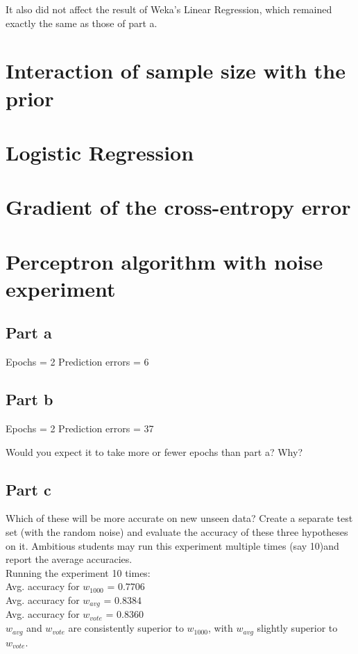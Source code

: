 \documentclass{article}
\begin{document}
It also did not affect the result of Weka's Linear Regression, which remained exactly the same as those of part a. 

\section{Interaction of sample size with the prior}

\section{Logistic Regression}

\section{Gradient of the cross-entropy error}

\section{Perceptron algorithm with noise experiment}

\subsection*{Part a}
Epochs = 2
Prediction errors = 6

\subsection*{Part b}

Epochs = 2
Prediction errors = 37

Would you expect it to take more or fewer epochs than part a? Why?

\subsection*{Part c}

Which of these will be more accurate on new unseen data? Create a separate test set (with the random noise) and evaluate the accuracy of these three hypotheses on it. Ambitious students may run this experiment multiple times (say 10)and report the average accuracies.
\\
Running the experiment 10 times: \\
Avg. accuracy for $w_{1000}$ = $0.7706$ \\
Avg. accuracy for $w_{avg}$ = $0.8384$ \\
Avg. accuracy for $w_{vote}$ = $0.8360$ \\

\noindent $w_{avg}$ and $w_{vote}$ are consistently superior to $w_{1000}$, with $w_{avg}$ slightly superior to $w_{vote}$.
\end{document}
